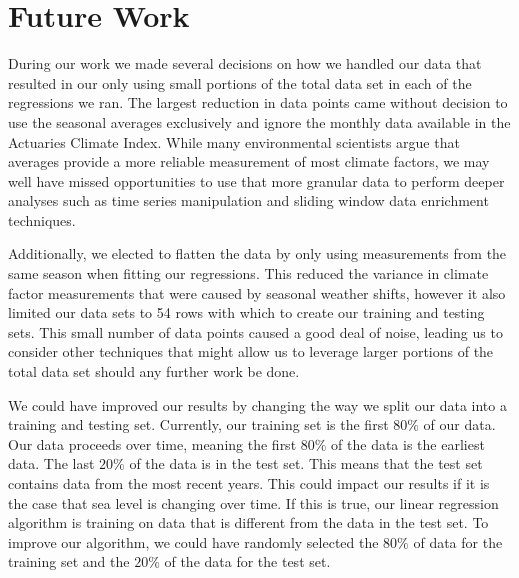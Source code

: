 \documentclass[12pt]{report}
\begin{document}
\section* {Future Work}
\indent \par During our work we made several decisions on how we handled our data that resulted in our only using small portions of the total data set in each of the regressions we ran. The largest reduction in data points came without decision to use the seasonal averages exclusively and ignore the monthly data available in the Actuaries Climate Index. While many environmental scientists argue that averages provide a more reliable measurement of most climate factors, we may well have missed opportunities to use that more granular data to perform deeper analyses such as time series manipulation and sliding window data enrichment techniques. 
\par Additionally, we elected to flatten the data by only using measurements from the same season when fitting our regressions. This reduced the variance in climate factor measurements that were caused by seasonal weather shifts, however it also limited our data sets to 54 rows with which to create our training and testing sets. This small number of data points caused a good deal of noise, leading us to consider other techniques that might allow us to leverage larger portions of the total data set should any further work be done.
\par We could have improved our results by changing the way we split our data into a training and testing set. Currently, our training set is the first $80\%$ of our data. Our data proceeds over time, meaning the first $80\%$ of the data is the earliest data. The last $20\%$ of the data is in the test set. This means that the test set contains data from the most recent years. This could impact our results if it is the case that sea level is changing over time. If this is true, our linear regression algorithm is training on data that is different from the data in the test set. To improve our algorithm, we could have randomly selected the $80\%$ of data for the training set and the $20\%$ of the data for the test set.
\end{document}

